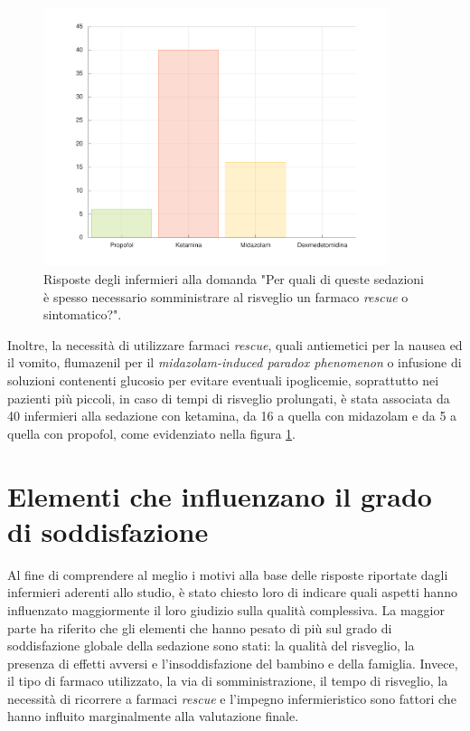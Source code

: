 \begin{figure}[!h]
    \centering
    \includegraphics[width=0.9\textwidth]{Figure/rescue.pdf}
    \caption{Risposte degli infermieri alla domanda "Per quali di queste sedazioni è spesso necessario somministrare al risveglio un farmaco \emph{rescue} o sintomatico?".} %
    \label{fig:rescue}
\end{figure}

Inoltre, la necessità di utilizzare farmaci \emph{rescue}, quali antiemetici per la nausea ed il vomito, flumazenil per il \emph{midazolam-induced paradox phenomenon} o infusione di soluzioni contenenti glucosio per evitare eventuali ipoglicemie, soprattutto nei pazienti più piccoli, in caso di tempi di risveglio prolungati, è stata associata da 40 infermieri alla sedazione con ketamina, da 16 a quella con midazolam e da 5 a quella con propofol, come evidenziato nella figura \ref{fig:rescue}.


\section{Elementi che influenzano il grado di soddisfazione}

Al fine di comprendere al meglio i motivi alla base delle risposte riportate dagli infermieri aderenti allo studio, è stato chiesto loro di indicare quali aspetti hanno influenzato maggiormente il loro giudizio sulla qualità complessiva. La maggior parte ha riferito che gli elementi che hanno pesato di più sul grado di soddisfazione globale della sedazione sono stati: la qualità del risveglio, la presenza di effetti avversi e l'insoddisfazione del bambino e della famiglia. Invece, il tipo di farmaco utilizzato, la via di somministrazione, il tempo di risveglio, la necessità di ricorrere a farmaci \emph{rescue} e l'impegno infermieristico sono fattori che hanno influito marginalmente alla valutazione finale.

